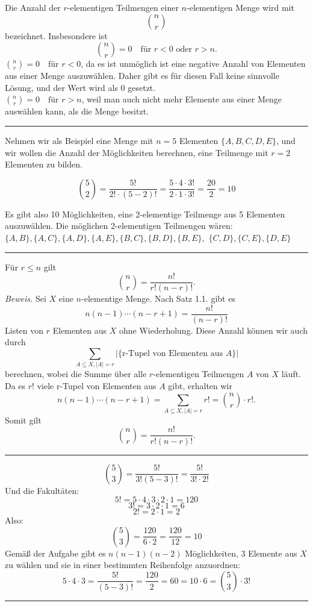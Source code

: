 \documentclass[9pt]{article}
\begin{document}
\begin{defi}
Die Anzahl der $r$-elementigen Teilmengen einer $n$-elementigen Menge wird mit 
\[
\binom{n}{r}
\]
bezeichnet.
Insbesondere ist 
\[
\binom{n}{r} = 0 \quad \text{für } r < 0 \text{ oder } r > n.
\]
\color{Blue}
$\binom{n}{r} = 0 \quad \text{für } r < 0$, da es ist unmöglich ist eine negative Anzahl von Elementen aus einer Menge auszuwählen. Daher gibt es für diesen Fall keine sinnvolle Lösung, und der Wert wird als 0 gesetzt. \\
$\binom{n}{r} = 0 \quad \text{für } r > n$, weil man auch nicht mehr Elemente aus einer Menge auswählen kann, als die Menge besitzt.

\end{defi} \noindent \rule{8cm}{0.4pt}
\color{Blue}
\begin{bsp}
\color{Blue}
Nehmen wir als Beispiel eine Menge mit \( n = 5 \) Elementen \( \{A, B, C, D, E\} \), und wir wollen die Anzahl der Möglichkeiten berechnen, eine Teilmenge mit \( r = 2 \) Elementen zu bilden.

\[
\binom{5}{2} = \frac{5!}{2! \cdot (5 - 2)!} = \frac{5 \cdot 4 \cdot 3!}{2 \cdot 1 \cdot 3!} = \frac{20}{2} = 10
\]

Es gibt also 10 Möglichkeiten, eine 2-elementige Teilmenge aus 5 Elementen auszuwählen. Die möglichen 2-elementigen Teilmengen wären:
$
\{A, B\}, \{A, C\}, \{A, D\}, \{A, E\}, \{B, C\}, \{B, D\}, \{B, E\}, $ $\{C, D\}, \{C, E\}, \{D, E\}
$

\end{bsp} \noindent \rule{8cm}{0.4pt}
\color{black}
\begin{satz}
Für $r \leq n$ gilt
\[
\binom{n}{r} = \frac{n!}{r!(n - r)!}.
\]
\textit{Beweis.} Sei $X$ eine $n$-elementige Menge. Nach Satz 1.1. gibt es 
\[
n(n - 1) \cdots (n - r + 1) = \frac{n!}{(n - r)!}
\]
Listen von $r$ Elementen aus $X$ ohne Wiederholung. Diese Anzahl können wir auch durch 
\[
\sum_{A \subseteq X, |A| = r} | \{ \text{r-Tupel von Elementen aus } A \} |
\]
berechnen, wobei die Summe über alle $r$-elementigen Teilmengen $A$ von $X$ läuft. Da es $r!$ viele r-Tupel von Elementen aus $A$ gibt, erhalten wir
\[
n(n - 1) \cdots (n - r + 1) = \sum_{A \subseteq X, |A| = r} r! = \binom{n}{r} \cdot r!.
\]
Somit gilt
\[
\binom{n}{r} = \frac{n!}{r!(n - r)!}.
\]

 \end{satz} \noindent \rule{8cm}{0.4pt}
\color{Blue}
\begin{bsp}
\[
\binom{5}{3} = \frac{5!}{3!(5 - 3)!} = \frac{5!}{3! \cdot 2!}
\]
Und die Fakultäten: 
\[
5! = 5 \cdot 4 \cdot 3 \cdot 2 \cdot 1 = 120
\]
\[
3! = 3 \cdot 2 \cdot 1 = 6
\]
\[
2! = 2 \cdot 1 = 2
\]
Also: 
\[
\binom{5}{3} = \frac{120}{6 \cdot 2} = \frac{120}{12} = 10
\]
Gemäß der Aufgabe gibt es \(n(n - 1)(n - 2)\) Möglichkeiten, 3 Elemente aus \(X\) zu wählen und sie in einer bestimmten Reihenfolge anzuordnen:
\[
5 \cdot 4 \cdot 3 = \frac{5!}{(5 - 3)!} = \frac{120}{2} = 60 = 10 \cdot 6 = \binom{5}{3} \cdot 3!
\]
\end{bsp} \noindent \rule{8cm}{0.4pt}
\color{black}
\end{document}
